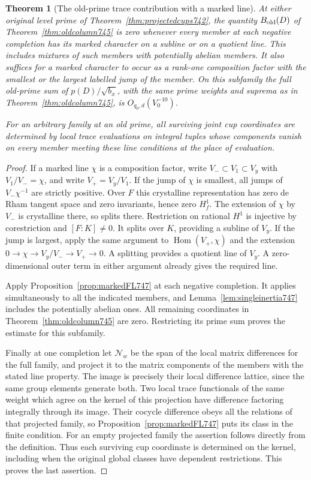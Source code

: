 \documentclass[a4paper,11pt]{article}
\newtheorem{theorem}[proposition]{Theorem}
\theoremstyle{definition}
\theoremstyle{remark}
\numberwithin{equation}{section}
\begin{document}
\begin{theorem}[The old-prime trace contribution with a marked line]
\leavevmode\label{thm:markedloss747}
At either original level prime of Theorem~\ref{thm:projectedcups742},
the quantity \(B_{\rm old}(D)\) of Theorem~\ref{thm:oldcolumn745}
is zero whenever every member at each negative completion has
its marked character on a subline or on a quotient line. This
includes mixtures of such members with potentially abelian members.
It also suffices for a marked character to occur as a rank-one
composition factor with the smallest or the largest labelled
jump of the member. On this subfamily the full old-prime sum
of \(p(D)/\sqrt{b_x}\), with the same prime weights and suprema
as in Theorem~\ref{thm:oldcolumn745}, is
\(O_{q_0,d}(V_0^{-10})\).

For an arbitrary family at an old prime, all surviving joint
cup coordinates are determined by local trace evaluations on
integral tuples whose components vanish on every member meeting
these line conditions at the place of evaluation.
\end{theorem}
\begin{proof}
If a marked line \(\chi\) is a composition factor, write
\(V_-\subset V_1\subset V_y\) with \(V_1/V_-=\chi\), and
write \(V_+=V_y/V_1\). If the jump of \(\chi\) is smallest,
all jumps of \(V_-\chi^{-1}\) are strictly positive. Over \(F\)
this crystalline representation has zero de Rham tangent space
and zero invariants, hence zero \(H^1_f\). The extension of
\(\chi\) by \(V_-\) is crystalline there, so splits there.
Restriction on rational \(H^1\) is injective by corestriction
and \([F:K]\ne0\). It splits over \(K\), providing a subline of
\(V_y\). If the jump is largest, apply the same argument to
\(\operatorname{Hom}(V_+,\chi)\) and the extension
\(0\to\chi\to V_y/V_-\to V_+\to0\). A splitting provides a
quotient line of \(V_y\). A zero-dimensional outer term in
either argument already gives the required line.

Apply Proposition~\ref{prop:markedFL747} at each negative
completion. It applies simultaneously to all the indicated
members, and Lemma~\ref{lem:singleinertia747} includes the
potentially abelian ones. All remaining coordinates in
Theorem~\ref{thm:oldcolumn745} are zero. Restricting its prime
sum proves the estimate for this subfamily.

Finally at one completion let \(\mathcal N_w\) be the span of the
local matrix differences for the full family, and project it
to the matrix components of the members with the stated line
property. The image is precisely their local difference lattice,
since the same group elements generate both. Two local trace
functionals of the same weight which agree on the kernel of
this projection have difference factoring integrally through
its image. Their cocycle difference obeys all the relations of
that projected family, so Proposition~\ref{prop:markedFL747}
puts its class in the finite condition. For an empty projected
family the assertion follows directly from the definition.
Thus each surviving cup coordinate is determined on the kernel,
including when the original global classes have dependent
restrictions. This proves the last assertion.
\end{proof}
\end{document}
